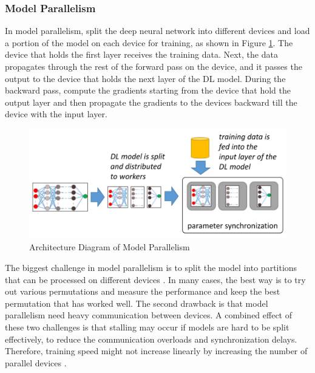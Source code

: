 \subsubsection{Model Parallelism}
In model parallelism, split the deep neural network into different devices and load a portion of the model on each device for training, as shown in Figure \ref{fig:modelparallel}. The device that holds the first layer receives the training data. Next, the data propagates through the rest of the forward pass on the device, and it passes the output to the device that holds the next layer of the DL model. During the backward pass, compute the gradients starting from the device that hold the output layer and then propagate the gradients to the devices backward till the device with the input layer. 

\begin{figure}[ht]
  \begin{center}
    \includegraphics[width=\textwidth]{images/model parallelism.png} 
    \caption{Architecture Diagram of Model Parallelism  \cite{Mayer2020ScalableInfrastructures}}
    \label{fig:modelparallel}
  \end{center}
\end{figure}

The biggest challenge in model parallelism is to split the model into partitions that can be processed on different devices \cite{Mayer2017ThePath}. In many cases, the best way is to try out various permutations and measure the performance and keep the best permutation that has worked well. The second drawback is that model parallelism need heavy communication between devices. A combined effect of these two challenges is that stalling may occur if models are hard to be split effectively, to reduce the communication overloads and synchronization delays. Therefore, training speed might not increase linearly by increasing the number of parallel devices \cite{Mirhoseini2017DeviceLearning}.

